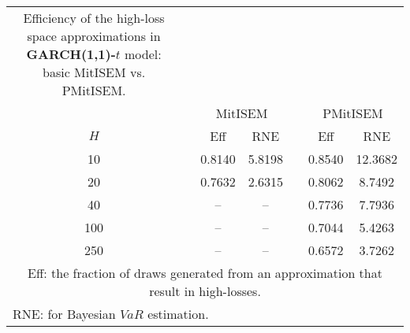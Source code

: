 { \renewcommand{\arraystretch}{1.2} 
\begin{longtable}{cc cc c cc} 
\caption{Efficiency of the high-loss space approximations in \textbf{GARCH(1,1)-$t$} model:\\ basic MitISEM vs. PMitISEM.} 
\label{tab:efft_garch2_noS} \\ 
 && \multicolumn{2}{c}{MitISEM} && \multicolumn{2}{c}{PMitISEM} \\ \cline{3-4} \cline{6-7} 
 $H$ && Eff  & RNE && Eff & RNE  \\ \cline{1-1} \cline{3-4} \cline{6-7} 
10 & &0.8140 &  5.8198 && 0.8540 &  12.3682 \\ [1ex] 
20 & &0.7632 &  2.6315 && 0.8062 &  8.7492 \\ [1ex] 
40 & &-- & -- && 0.7736 &  7.7936 \\ [1ex] 
100 & &-- & -- && 0.7044 &  5.4263 \\ [1ex] 
250 & &-- & -- && 0.6572 &  3.7262 \\ [1ex] 
\hline 
\multicolumn{7}{p{7cm}}{\footnotesize{Eff: the fraction of draws generated from an approximation that result in high-losses.}}  \\ 
\multicolumn{7}{l}{\footnotesize{RNE: for Bayesian $VaR$ estimation.}} 
\end{longtable} 
} 
\normalsize 
